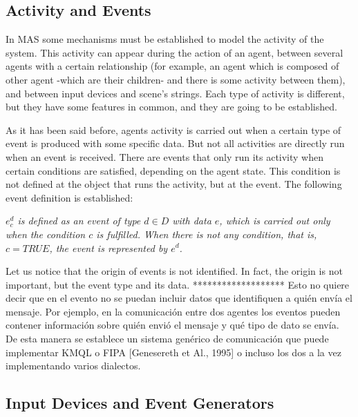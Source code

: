 \documentclass[runningheads]{llncs}
\begin{document}
\subsection{Activity and Events
\label{sec:activity_events}}
	
In MAS some mechanisms must be established to model the activity of the system.
This activity can appear during the action of an agent, between several agents with a certain
relationship (for example, an agent which is composed of other agent -which are their children-
and there is some activity between them), and between input devices and scene's strings. Each type
of activity is different, but they have some features in common, and they are going to be
established.
	
As it has been said before, agents activity is carried out when a certain type of event is produced
with some specific data. But not all activities are directly run when an event is received. There
are events that only run its activity when certain conditions are satisfied, depending on the
agent state. This condition is not defined at the object that runs the activity, but at the event.
The following event definition is established:

{\itshape
$e_c^d$ is defined as an event of type $d \in D$ with data $e$, which is carried out only when the
condition $c$ is fulfilled. When there is not any condition, that is, $c = TRUE$, the event is
represented by $e^d$.
}
	
Let us notice that the origin of events is not identified. In fact, the origin is not
important, but the event type and its data. ******************* Esto no quiere decir que en el evento no se puedan incluir datos que identifiquen a quién envía el mensaje. Por ejemplo, en la comunicación entre dos agentes  los eventos pueden contener información sobre quién envió el mensaje y qué tipo de dato se envía. De esta manera se establece un sistema genérico de comunicación que puede implementar KMQL o FIPA [Genesereth et Al., 1995] o incluso los dos a la vez implementando varios dialectos.
	
	
	
	
\subsection{Input Devices and Event Generators
\label{sec:input_devices}}
	
\end{document}
